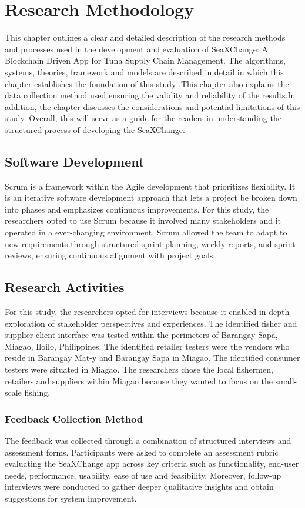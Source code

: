 \chapter{Research Methodology}
This chapter outlines a clear and detailed description of the research methods and processes used in the development and evaluation of SeaXChange: A Blockchain Driven App for Tuna Supply Chain Management. The algorithms, systems, theories, framework and models are described in detail in which this chapter establishes the foundation of this study .This chapter also explains the data collection method used ensuring the validity and reliability of the results.In addition, the chapter discusses the considerations and potential limitations of this study. Overall, this will serve as a guide for the readers in understanding the structured process of developing the SeaXChange.

\section{Software Development}
Scrum is a framework within the Agile development that prioritizes flexibility. It is an iterative software development approach that lets a project be broken down into phases and emphasizes continuous improvements. For this study, the researchers opted to use Scrum  because it involved many stakeholders and it operated in a ever-changing environment. Scrum allowed the team to adapt to new requirements through structured sprint planning, weekly reports, and sprint reviews, ensuring continuous alignment with project goals.

\section{Research Activities}
For this study, the researchers opted for interviews because it enabled in-depth exploration of stakeholder perspectives and experiences. The identified fisher and supplier client interface was tested within the perimeters of Barangay Sapa, Miagao, Iloilo, Philippines. The identified retailer testers were the vendors who reside in Barangay Mat-y and Barangay Sapa in Miagao. The identified consumer testers were situated in Miagao. The researchers chose the local fishermen, retailers and suppliers within Miagao because they wanted to focus on the small-scale fishing. 

\subsection{Feedback Collection Method}
The feedback was collected through a combination of structured interviews and assessment forms. Participants were asked to complete an assessment rubric evaluating the SeaXChange app across key criteria such as functionality, end-user needs, performance, usability, ease of use and feasibility. Moreover, follow-up interviews were conducted to gather deeper qualitative insights and obtain suggestions for system improvement.

